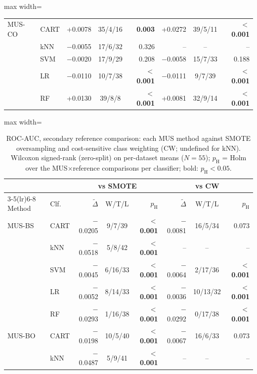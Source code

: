 \begin{table}[!htbp]
\begin{adjustbox}{max width=\linewidth}
\begin{tabular}{llrcrrcr}
\midrule
MUS-CO & CART & +0.0078 & 35/4/16 & \textbf{0.003} & +0.0272 & 39/5/11 & \textbf{$<$0.001} \\
 & kNN & $-$0.0055 & 17/6/32 & 0.326 & -- & -- & -- \\
 & SVM & $-$0.0020 & 17/9/29 & 0.208 & $-$0.0058 & 15/7/33 & 0.188 \\
 & LR & $-$0.0110 & 10/7/38 & \textbf{$<$0.001} & $-$0.0111 & 9/7/39 & \textbf{$<$0.001} \\
 & RF & +0.0130 & 39/8/8 & \textbf{$<$0.001} & +0.0081 & 32/9/14 & \textbf{$<$0.001} \\
\bottomrule
\end{tabular}
\end{adjustbox}
\end{table}

\begin{table}[!htbp]
\centering
\caption{ROC-AUC, secondary reference comparison: each MUS method against SMOTE oversampling and cost-sensitive class weighting (CW; undefined for kNN). Wilcoxon signed-rank (zero-split) on per-dataset means ($N=55$); $p_\mathrm{H}$ = Holm over the MUS$\times$reference comparisons per classifier; bold: $p_\mathrm{H}<0.05$.}
\label{tab:reference_auc}
\scriptsize
\setlength{\tabcolsep}{3pt}
\begin{adjustbox}{max width=\linewidth}
\begin{tabular}{llrcrrcr}
\toprule
 & & \multicolumn{3}{c}{vs SMOTE} & \multicolumn{3}{c}{vs CW} \\
\cmidrule(lr){3-5}\cmidrule(lr){6-8}
Method & Clf. & $\tilde\Delta$ & W/T/L & $p_\mathrm{H}$ & $\tilde\Delta$ & W/T/L & $p_\mathrm{H}$ \\
\midrule
MUS-BS & CART & $-$0.0205 & 9/7/39 & \textbf{$<$0.001} & $-$0.0081 & 16/5/34 & 0.073 \\
 & kNN & $-$0.0518 & 5/8/42 & \textbf{$<$0.001} & -- & -- & -- \\
 & SVM & $-$0.0045 & 6/16/33 & \textbf{$<$0.001} & $-$0.0064 & 2/17/36 & \textbf{$<$0.001} \\
 & LR & $-$0.0052 & 8/14/33 & \textbf{$<$0.001} & $-$0.0036 & 10/13/32 & \textbf{$<$0.001} \\
 & RF & $-$0.0293 & 1/16/38 & \textbf{$<$0.001} & $-$0.0292 & 0/17/38 & \textbf{$<$0.001} \\
\midrule
MUS-BO & CART & $-$0.0198 & 10/5/40 & \textbf{$<$0.001} & $-$0.0067 & 16/6/33 & 0.073 \\
 & kNN & $-$0.0487 & 5/9/41 & \textbf{$<$0.001} & -- & -- & -- \\

\end{tabular}
\end{adjustbox}
\end{table}
